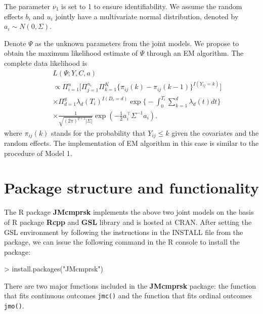 The parameter $\nu_1$ is set to 1 to ensure identifiability. We assume the random effects $b_i$ and $u_i$ jointly have a multivariate normal distribution, denoted by $a_i\sim N(0,\Sigma)$.

Denote $\Psi$ as the unknown parameters from the joint models. We propose to obtain the maximum likelihood estimate of $\Psi$ through an EM algorithm. The complete data likelihood is
\begin{eqnarray*}
&&L(\Psi;Y,C,a)\\
&&\propto \Pi_{i=1}^n\Big[\Pi_{j=1}^{n_i}\Pi_{k=1}^{K}\{\pi_{ij}(k)-\pi_{ij}(k-1)\}^{I(Y_{ij}=k)}\Big]\\
&&\times \Pi_{d=1}^g\lambda_d(T_i)^{I(D_i=d)}\exp\Big\{-\int_0^{T_i}\sum_{k=1}^d\lambda_d(t)dt\Big\}\\
&&\times \frac{1}{\sqrt{(2\pi)^{q+1}|\Sigma|}}\exp(-\frac{1}{2}a_i^\top\Sigma^{-1}a_i).
\end{eqnarray*}
where $\pi_{ij}(k)$ stands for the probability that $Y_{ij}\leq k$ given the covariates and the random effects. The implementation of EM algorithm in this case is similar to the procedure of Model 1.


\section{Package structure and functionality}

The R package \textbf{JMcmprsk} implements the above two joint models on the basis of R package \textbf{Rcpp} \citep{eddelbuettel2011rcpp}  and \textbf{GSL} library\citep{galassi2002gnu} and is hosted at CRAN. After setting the GSL environment by following the instructions in the INSTALL file from the package, we can issue the following command in the R console to install the package:

> install.packages("JMcmprsk")

There are two  major functions included in the \textbf{JMcmprsk} package: the function that fits continuous outcomes  \texttt{jmc()}  and the function that fits ordinal outcomes \texttt{jmo()}.

